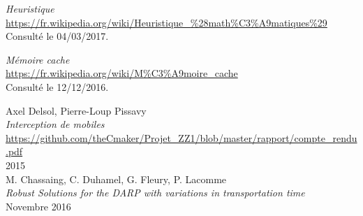 \renewcommand{\bibname}{Webographie}
\begin{thebibliography}{9}
    \emph{Heuristique}\\
    \url{https://fr.wikipedia.org/wiki/Heuristique_%28math%C3%A9matiques%29}\\
    Consulté le 04/03/2017.
  
    \emph{Mémoire cache}\\
    \url{https://fr.wikipedia.org/wiki/M%C3%A9moire_cache}\\
    Consulté le 12/12/2016.
    
    Axel Delsol, Pierre-Loup Pissavy\\
    \emph{Interception de mobiles}\\
    \url{https://github.com/theCmaker/Projet_ZZ1/blob/master/rapport/compte_rendu.pdf}\\
    2015\\
    
    M. Chassaing, C. Duhamel, G. Fleury, P. Lacomme\\
    \emph{Robust Solutions for the DARP with variations in transportation time}\\
    Novembre 2016\\
\end{thebibliography}
